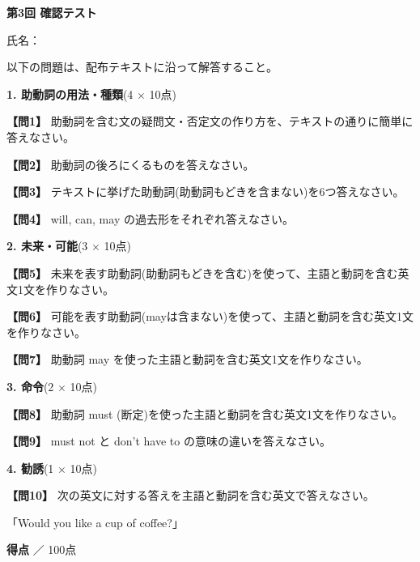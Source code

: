 
\begin{center}
{\Large\textbf{第3回 確認テスト}}
\end{center}
\vspace{0.15em}
\begin{flushright}
氏名：\underline{\hspace{14em}}
\end{flushright}
\vspace{0.25em}
\noindent 以下の問題は、配布テキストに沿って解答すること。
\vspace{0.35em}

\noindent\textbf{1. 助動詞の用法・種類}(4 $\times$ 10点)

\noindent\textbf{【問1】} 助動詞を含む文の疑問文・否定文の作り方を、テキストの通りに簡単に答えなさい。
\testqsep

\noindent\textbf{【問2】} 助動詞の後ろにくるものを答えなさい。
\testqsep

\noindent\textbf{【問3】} テキストに挙げた助動詞(助動詞もどきを含まない)を6つ答えなさい。
\testqsep

\noindent\textbf{【問4】} will, can, may の過去形をそれぞれ答えなさい。
\testqsep

\noindent\textbf{2. 未来・可能}(3 $\times$ 10点)

\noindent\textbf{【問5】} 未来を表す助動詞(助動詞もどきを含む)を使って、主語と動詞を含む英文1文を作りなさい。
\testqsep

\noindent\textbf{【問6】} 可能を表す助動詞(mayは含まない)を使って、主語と動詞を含む英文1文を作りなさい。
\testqsep

\noindent\textbf{【問7】} 助動詞 may を使った主語と動詞を含む英文1文を作りなさい。
\testqsep

\noindent\textbf{3. 命令}(2 $\times$ 10点)

\noindent\textbf{【問8】} 助動詞 must (断定)を使った主語と動詞を含む英文1文を作りなさい。
\testqsep

\noindent\textbf{【問9】} must not と don't have to の意味の違いを答えなさい。
\testqsep

\noindent\textbf{4. 勧誘}(1 $\times$ 10点)

\noindent\textbf{【問10】} 次の英文に対する答えを主語と動詞を含む英文で答えなさい。

「Would you like a cup of coffee?」
\testqsep

\begin{flushright}
\textbf{得点} \underline{\hspace{8em}} ／ 100点
\end{flushright}
